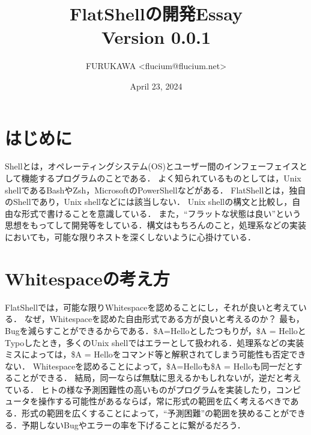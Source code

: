 \documentclass{article}
\title{FlatShellの開発Essay\\ \large Version 0.0.1}
\author{FURUKAWA \textless flucium@flucium.net\textgreater }
\date{April 23, 2024}
\begin{document}
\maketitle

\tableofcontents
\clearpage

\section{はじめに}
Shellとは，オペレーティングシステム(OS)とユーザー間のインフェーフェイスとして機能するプログラムのことである．\newline
よく知られているものとしては，Unix shellであるBashやZsh，MicrosoftのPowerShellなどがある．\newline
FlatShellとは，独自のShellであり，Unix shellなどには該当しない．\newline
Unix shellの構文と比較し，自由な形式で書けることを意識している．\newline
また，“フラットな状態は良い”という思想をもってして開発等をしている．構文はもちろんのこと，処理系などの実装においても，可能な限りネストを深くしないように心掛けている．

\newpage

\section{Whitespaceの考え方}
FlatShellでは，可能な限りWhitespaceを認めることにし，それが良いと考えている．\newline
なぜ，Whitespaceを認めた自由形式である方が良いと考えるのか？ 最も，Bugを減らすことができるからである．\$A=Helloとしたつもりが，\$A = HelloとTypoしたとき，多くのUnix shellではエラーとして扱われる．処理系などの実装ミスによっては，\$A = Helloをコマンド等と解釈されてしまう可能性も否定できない．\newline
Whitespaceを認めることによって，\$A=Helloも\$A = Helloも同一だとすることができる．\newline
結局，同一ならば無駄に思えるかもしれないが，逆だと考えている．\newline
ヒトの様な予測困難性の高いものがプログラムを実装したり，コンピュータを操作する可能性があるならば，常に形式の範囲を広く考えるべきである．形式の範囲を広くすることによって，“予測困難”の範囲を狭めることができる．予期しないBugやエラーの率を下げることに繋がるだろう．\newline
\end{document}
